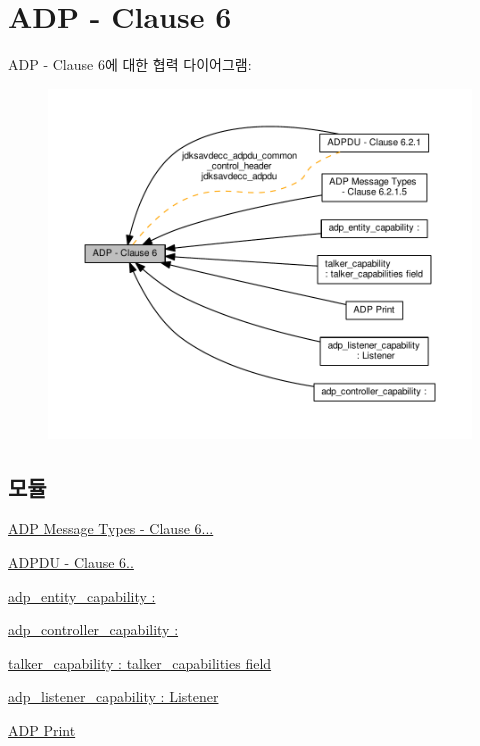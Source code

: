 \hypertarget{group__adp}{}\section{A\+DP -\/ Clause 6}
\label{group__adp}
A\+DP -\/ Clause 6에 대한 협력 다이어그램\+:
\nopagebreak
\begin{figure}[H]
\begin{center}
\leavevmode
\includegraphics[width=350pt]{group__adp}
\end{center}
\end{figure}
\subsection*{모듈}
\begin{DoxyCompactItemize}
\item 
\hyperlink{group__adpdu__msg}{A\+D\+P Message Types -\/ Clause 6...}
\item 
\hyperlink{group__adpdu}{A\+D\+P\+D\+U -\/ Clause 6..}
\item 
\hyperlink{group__adp__entity__capability}{adp\+\_\+entity\+\_\+capability \+:}
\item 
\hyperlink{group__adp__controller__capability}{adp\+\_\+controller\+\_\+capability \+:}
\item 
\hyperlink{group__talker__capability}{talker\+\_\+capability \+: talker\+\_\+capabilities field}
\item 
\hyperlink{group__adp__listener__capability}{adp\+\_\+listener\+\_\+capability \+: Listener}
\item 
\hyperlink{group__adp__print}{A\+D\+P Print}
\end{DoxyCompactItemize}

